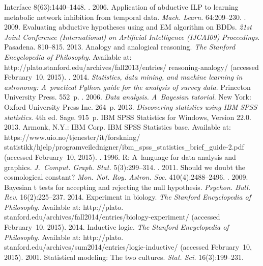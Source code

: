 \begin{multicols}{2}
{{\begin{thebibliography}{99}
{Interface} 8(63):1440--1448.
. 2006.
Application of abductive ILP to learning metabolic network inhibition from temporal
data. \textit{Mach. Learn.} 64:209--230.
. 2009.
Evaluating abductive hypotheses using and EM algorithm on BDDs. \textit{21st Joint
Conference (International) on Artificial Intelligence (IJCAI09) Proceedings}.
Pasadena. 810--815.
 2013. Analogy and analogical reasoning. \textit{The Stanford
Encyclopedia of Philosophy}. Available at:    {\sf
http://plato.stanford.edu/archives/fall2013/entries/ reasoning-analogy/} (accessed
February~10, 2015).
. 2014. \textit{Statistics, data mining, and machine learning in
astronomy: A~practical Python guide for the analysis of survey data}. Princeton
University Press. 552~p.
. 2006. \textit{Data analysis. A~Bayesian tutorial}.
New York: Oxford University Press Inc. 264~p.
 2013. \textit{Discovering statistics using IBM SPSS statistics}.
4th ed. Sage.  915~p.
IBM SPSS Statistics for Windows, Version 22.0. 2013. Armonk, N.Y.: IBM Corp. IBM
SPSS Statistics base.  Available at: {\sf
https://www.uio.no/tjenester/it/forskning/\linebreak
statistikk/hjelp/programveilednigner/ibm\_spss\_\linebreak statistics\_brief\_guide-2.pdf}
(accessed February~10, 2015).
. 1996. R: A~language for data analysis and
graphics. \textit{J.~Comput. Graph. Stat.} 5(3):299--314.
. 2011.
Should we doubt the cosmological constant? \textit{Mon. Not. Roy.
Astron. Soc.} 410(4):2488--2496.
.
2009. Bayesian t tests for accepting and rejecting the null hypothesis.
\textit{Psychon. Bull. Rev.} 16(2):225--237.
 2014. Experiment in biology. \textit{The Stanford Encyclopedia of
Philosophy}. Available at: {\sf
http://plato. stanford.edu/archives/fall2014/entries/biology-experiment/} (accessed
February~10, 2015).
 2014. Inductive logic. \textit{The Stanford Encyclopedia of
Philosophy}. Available at: {\sf
http://plato. stanford.edu/archives/sum2014/entries/logic-inductive/} (accessed
February~10, 2015).
 2001. Statistical modeling: The two cultures. \textit{Stat.
Sci.} 16(3):199--231.


\end{thebibliography}}}
\end{multicols}
